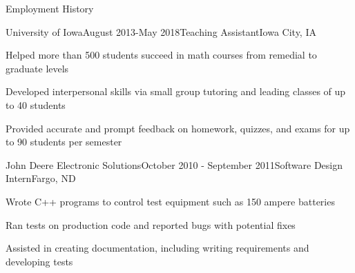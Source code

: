 \documentclass{resume} %
\begin{document}

\begin{rSection}{Employment History}

\begin{rSubsection}{University of Iowa}{August 2013-May 2018}{Teaching Assistant}{Iowa City, IA}
\item Helped more than 500 students succeed in math courses from remedial to graduate levels
\item Developed interpersonal skills via small group tutoring and leading classes of up to 40 students
\item Provided accurate and prompt feedback on homework, quizzes, and exams for up to 90 students per semester
\end{rSubsection}


\begin{rSubsection}{John Deere Electronic Solutions}{October 2010 - September 2011}{Software Design Intern}{Fargo, ND}
\item Wrote C++ programs to control test equipment such as 150 ampere batteries
\item Ran tests on production code and reported bugs with potential fixes
\item Assisted in creating documentation, including writing requirements and developing tests
\end{rSubsection}



\end{rSection}







\end{document}
